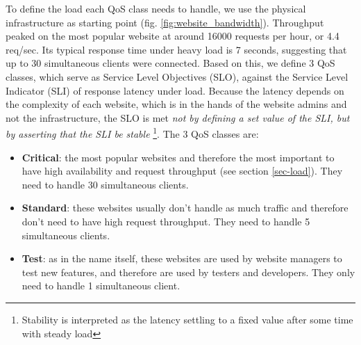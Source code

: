 To define the load each QoS class needs to handle, we use the physical infrastructure as starting point (fig. \ref{fig:website_bandwidth}).
Throughput peaked on the most popular website at around 16000 requests per hour, or 4.4 req/sec.
Its typical response time under heavy load is 7 seconds, suggesting that up to 30 simultaneous clients were connected.
Based on this, we define 3 QoS classes, which serve as Service Level Objectives (SLO), against the Service Level Indicator (SLI) of response latency under load.
Because the latency depends on the complexity of each website, which is in the hands of the website admins and not the infrastructure,
the SLO is met \emph{not by defining a set value of the SLI, but by asserting that the SLI be stable}
\footnote{Stability is interpreted as the latency settling to a fixed value after some time with steady load}.
The 3 QoS classes are:

\begin{itemize}
    \item \textbf{Critical}: the most popular websites and therefore the most important to have high availability and request throughput (see section \ref{sec-load}).
    They need to handle 30 simultaneous clients.
    \item \textbf{Standard}: these websites usually don't handle as much traffic and therefore don't need to have high request throughput.
    They need to handle 5 simultaneous clients.
    \item \textbf{Test}: as in the name itself, these websites are used by website managers to test new features, and therefore are used by testers and developers.
    They only need to handle 1 simultaneous client.
\end{itemize}




